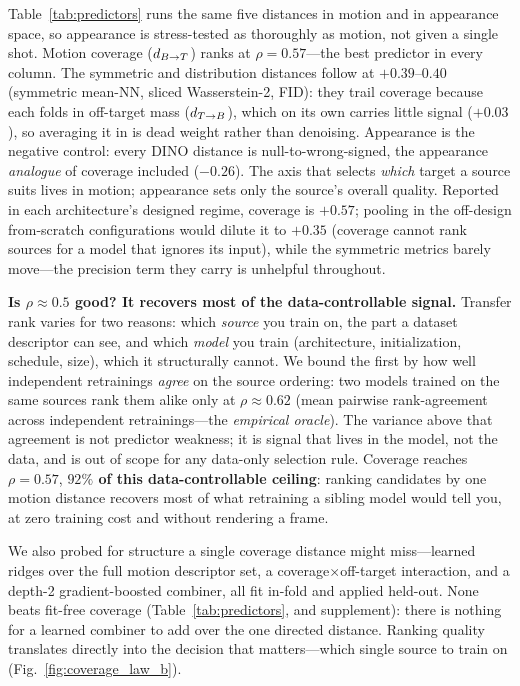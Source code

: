 Table~\ref{tab:predictors} runs the same five distances in motion and in
appearance space, so appearance is stress-tested as thoroughly as motion, not
given a single shot. Motion coverage ($d_{B\to T}$) ranks at $\rho{=}0.57$---the best
predictor in every column. The symmetric and distribution distances follow at
$+0.39$--$0.40$ (symmetric mean-NN, sliced Wasserstein-2, FID): they trail
coverage because each folds in off-target mass ($d_{T\to B}$), which on its own carries
little signal ($+0.03$), so averaging it in is dead weight rather than denoising.
Appearance is the negative control: every DINO distance is null-to-wrong-signed,
the appearance \emph{analogue} of coverage included ($-0.26$). The axis
that selects \emph{which} target a source suits lives in motion; appearance sets
only the source's overall quality.
Reported in each architecture's designed regime, coverage is $+0.57$; pooling in
the off-design from-scratch configurations would dilute it to $+0.35$ (coverage
cannot rank sources for a model that ignores its input), while the symmetric
metrics barely move---the precision term they carry is unhelpful throughout.

\noindent\textbf{Is $\rho{\approx}0.5$ good? It recovers most of the
data-controllable signal.} Transfer rank varies for two reasons: which
\emph{source} you train on, the part a dataset descriptor can see, and which
\emph{model} you train (architecture, initialization, schedule, size), which it
structurally cannot. We bound the first by how well independent retrainings
\emph{agree} on the source ordering: two models trained on the same sources rank
them alike only at $\rho{\approx}0.62$ (mean pairwise rank-agreement across
independent retrainings---the \emph{empirical oracle}). The variance above that
agreement is not predictor weakness; it is signal that lives in the model, not
the data, and is out of scope for any data-only selection rule. Coverage reaches
$\rho{=}0.57$, \textbf{$92\%$ of this data-controllable ceiling}: ranking
candidates by one motion distance recovers most of what retraining a sibling
model would tell you, at zero training cost and without rendering a frame.

We also probed for structure a single coverage distance might miss---learned
ridges over the full motion descriptor set, a coverage$\times$off-target
interaction, and a depth-2 gradient-boosted combiner, all fit in-fold and
applied held-out. None beats fit-free coverage (Table~\ref{tab:predictors}, and
supplement): there is nothing for a learned combiner to add over the one
directed distance. Ranking quality translates directly into the decision that
matters---which single source to train on (Fig.~\ref{fig:coverage_law_b}).

